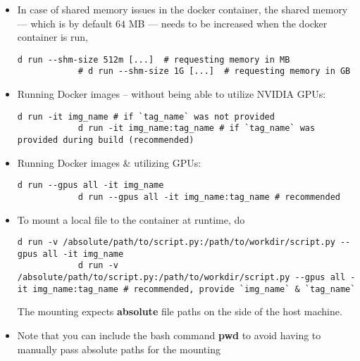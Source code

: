 \documentclass[12pt, a4paper]{scrbook}
\numberwithin{equation}{section}
\theoremstyle{definition}
\theoremstyle{definition}
\begin{document}
	\begin{itemize} 
		
		\item In case of shared memory issues in the docker container, the shared memory --- which is by default $64$ MB --- needs to be increased when the docker container is run,
		
		\begin{lstlisting}[style=mystylebash, label=alg:docker_run, xleftmargin=\parindent]
			d run --shm-size 512m [...]  # requesting memory in MB
			# d run --shm-size 1G [...]  # requesting memory in GB
		\end{lstlisting}
		
		\item Running Docker images -- without being able to utilize NVIDIA GPUs:
		
		\begin{lstlisting}[style=mystylebash, label=alg:docker_run, xleftmargin=\parindent]
			d run -it img_name # if `tag_name` was not provided
			d run -it img_name:tag_name # if `tag_name` was provided during build (recommended)
		\end{lstlisting}
		
		\item Running Docker images \& utilizing GPUs: 
		
		\begin{lstlisting}[style=mystylebash, label=alg:docker_run_gpus, xleftmargin=\parindent]
			d run --gpus all -it img_name 
			d run --gpus all -it img_name:tag_name # recommended
		\end{lstlisting}
		
		\item To mount a local file to the container at runtime, do
		
		\begin{lstlisting}[style=mystylebash, label=alg:docker__run_volume_mounting, xleftmargin=\parindent]
			d run -v /absolute/path/to/script.py:/path/to/workdir/script.py --gpus all -it img_name 
			d run -v /absolute/path/to/script.py:/path/to/workdir/script.py --gpus all -it img_name:tag_name # recommended, provide `img_name` & `tag_name`
		\end{lstlisting}
		
		The mounting expects \textbf{absolute} file paths on the side of the host machine.
		
		\item Note that you can include the bash command \textbf{pwd} to avoid having to manually pass absolute paths for the mounting
		

\end{itemize}
\end{document}
